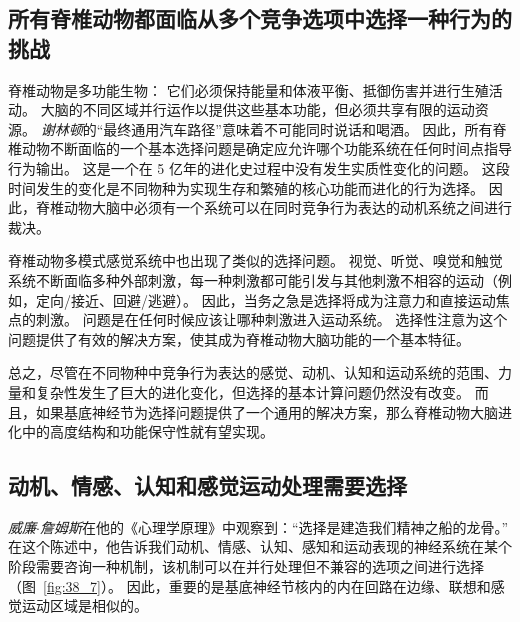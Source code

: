 \subsection{所有脊椎动物都面临从多个竞争选项中选择一种行为的挑战}

脊椎动物是多功能生物：
它们必须保持能量和体液平衡、抵御伤害并进行生殖活动。
大脑的不同区域并行运作以提供这些基本功能，但必须共享有限的运动资源。
\textit{谢林顿}的“最终通用汽车路径”意味着不可能同时说话和喝酒。
因此，所有脊椎动物不断面临的一个基本选择问题是确定应允许哪个功能系统在任何时间点指导行为输出。
这是一个在 5 亿年的进化史过程中没有发生实质性变化的问题。
这段时间发生的变化是不同物种为实现生存和繁殖的核心功能而进化的行为选择。
因此，脊椎动物大脑中必须有一个系统可以在同时竞争行为表达的动机系统之间进行裁决。


脊椎动物多模式感觉系统中也出现了类似的选择问题。
视觉、听觉、嗅觉和触觉系统不断面临多种外部刺激，每一种刺激都可能引发与其他刺激不相容的运动（例如，定向/接近、回避/逃避）。
因此，当务之急是选择将成为注意力和直接运动焦点的刺激。
问题是在任何时候应该让哪种刺激进入运动系统。
选择性注意为这个问题提供了有效的解决方案，使其成为脊椎动物大脑功能的一个基本特征。


总之，尽管在不同物种中竞争行为表达的感觉、动机、认知和运动系统的范围、力量和复杂性发生了巨大的进化变化，但选择的基本计算问题仍然没有改变。
而且，如果基底神经节为选择问题提供了一个通用的解决方案，那么脊椎动物大脑进化中的高度结构和功能保守性就有望实现。



\subsection{动机、情感、认知和感觉运动处理需要选择}

\textit{威廉$\cdot$詹姆斯}在他的《心理学原理》中观察到：“选择是建造我们精神之船的龙骨。” 
在这个陈述中，他告诉我们动机、情感、认知、感知和运动表现的神经系统在某个阶段需要咨询一种机制，该机制可以在并行处理但不兼容的选项之间进行选择（图~\ref{fig:38_7}）。
因此，重要的是基底神经节核内的内在回路在边缘、联想和感觉运动区域是相似的。


